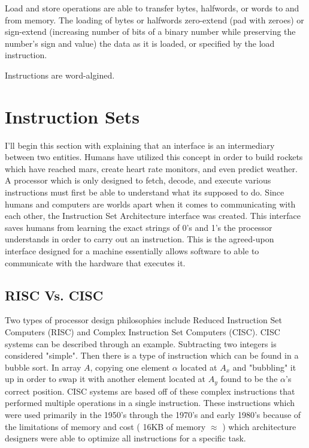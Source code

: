 \documentclass[12pt]{scrreprt}
\begin{document}
	Load and store operations are able to transfer bytes, halfwords, or words to and from memory. The loading of bytes or halfwords zero-extend
	(pad with zeroes) or sign-extend (increasing number of bits of a binary number while preserving the number's sign and value) the data as it is loaded, or specified by the load instruction.

	Instructions are word-algined.


{\let\clearpage\relax\chapter{Instruction Sets}}

	I'll begin this section with explaining that an interface is an intermediary between two entities. Humans have utilized this concept in order to build rockets which have reached mars, 
	create heart rate monitors, and even predict weather. A processor which is only designed to fetch, decode, and execute various instructions must first be able to understand what its 
	supposed to do. Since humans and computers are worlds apart when it comes to communicating with each other, the Instruction Set Architecture interface was created. This interface saves 
	humans from learning the exact strings of 0's and 1's the processor understands in order to carry out an instruction.
	This is the agreed-upon interface designed for a machine essentially allows software to able to communicate with the hardware that executes it.

	\section{RISC Vs. CISC}

	Two types of processor design philosophies include Reduced Instruction Set Computers (RISC) and Complex Instruction Set Computers (CISC).
	CISC systems can be described through an example. Subtracting two integers is considered "simple". Then there is a type of instruction which 
	can be found in a bubble sort. In array $ A $, copying one element $ \alpha $ located at $ A_{x} $ and "bubbling" it up in order to swap it
	with another element located at $ A_{y} $ found to be the $ \alpha $'s correct position. CISC systems are based off of these complex 
	instructions that performed multiple operations in a single instruction. These instructions which were used primarily in the 1950's through the 1970's and early 1980's because of the limitations of memory and cost ( 16KB of memory $\approx$  ) which architecture designers were able to optimize all instructions for a specific task.
\end{document}
